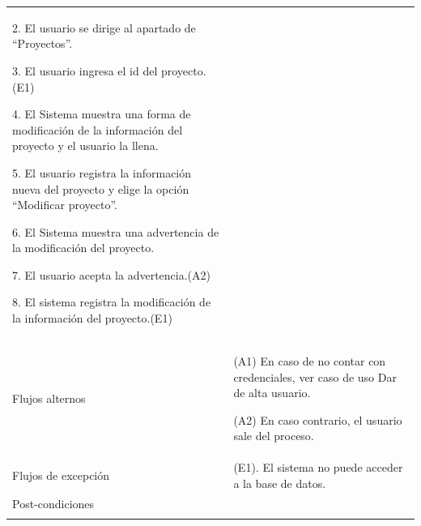 \begin{longtable}{@{\extracolsep{8pt}}l p{8.5cm}}
 2. El usuario se dirige al apartado de “Proyectos”. \par\vspace{.1cm}

 3. El usuario ingresa el id del proyecto.(E1) \par\vspace{.1cm}

 4. El Sistema muestra una forma de modificación de la información del proyecto y el usuario la llena. \par\vspace{.1cm}

 5. El usuario registra la información nueva del proyecto y elige la opción “Modificar proyecto”. \par\vspace{.1cm}

 6. El Sistema muestra una advertencia de la modificación del proyecto. \par\vspace{.1cm}

 7. El usuario acepta la advertencia.(A2) \par\vspace{.1cm}

 8. El sistema registra la modificación de la información del proyecto.(E1) \par\vspace{.1cm}

\\

\hspace{.2cm}Flujos alternos &
\par (A1) En caso de no contar con credenciales, ver caso de uso Dar de alta usuario.

\par (A2) En caso contrario, el usuario sale del proceso.



\\

\hspace{.2cm}Flujos de excepción &
\par\vspace{.1cm} (E1). El sistema no puede acceder a la base de datos.


\\%

\hspace{.2cm}Post-condiciones &
\\
\hline

 \\
\end{longtable}
\endgroup


